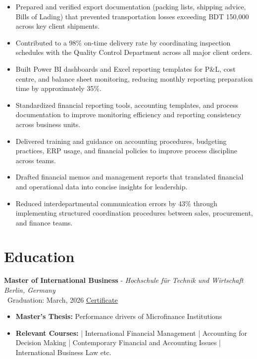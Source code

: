 \documentclass[a4paper,10pt]{article}
\begin{document}
\begin{itemize}[itemsep=0pt, topsep=0pt, leftmargin=2em]
\item Prepared and verified export documentation (packing lists, shipping advice, Bills of Lading) that prevented transportation losses exceeding BDT 150,000 across key client shipments.

\item Contributed to a 98\% on-time delivery rate by coordinating inspection schedules with the Quality Control Department across all major client orders.

\item Built Power BI dashboards and Excel reporting templates for P\&L, cost centre, and balance sheet monitoring, reducing monthly reporting preparation time by approximately 35\%.

\item Standardized financial reporting tools, accounting templates, and process documentation to improve monitoring efficiency and reporting consistency across business units.

\item Delivered training and guidance on accounting procedures, budgeting practices, ERP usage, and financial policies to improve process discipline across teams.

\item Drafted financial memos and management reports that translated financial and operational data into concise insights for leadership.

\item Reduced interdepartmental communication errors by 43\% through implementing structured coordination procedures between sales, procurement, and finance teams.


\end{itemize}


\section*{Education}

\textbf{Master of International Business} - 
 \textit{Hochschule für Technik und Wirtschaft Berlin, Germany} \\
 \textcolor{lightgray}{\faGraduationCap} \ Graduation: March, 2026  \quad \href{https://drive.google.com/file/d/1Y08vpQ_9_LY7ZBbkuyJ_0CS9jJbjPL95/view?usp=sharing}{\textcolor{lightgray}{\faFilePdf} \underline{Certificate}}
\begin{itemize}[itemsep=0pt, topsep=0pt, leftmargin=2em]
    \item \textbf{Master's Thesis:} Performance drivers of Microfinance Institutions
    \item \textbf{Relevant Courses:}  | International Financial Management | Accounting for Decision Making |  Contemporary Financial and Accounting Issues | International Business Law etc. 
 
\end{itemize}
\end{document}
